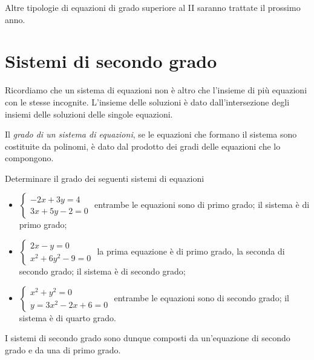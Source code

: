 
Altre tipologie di equazioni di grado superiore al II saranno trattate il 
prossimo anno.

\section{Sistemi di secondo grado}
\label{sec:eq2gr_sistemi}

Ricordiamo che un sistema di equazioni non è altro che l'insieme di più 
equazioni con le stesse incognite. L'insieme delle soluzioni è dato 
dall'intersezione degli insiemi delle soluzioni delle singole equazioni.

\begin{definizione}
Il \emph{grado di un sistema di equazioni}, se le equazioni che formano il 
sistema sono costituite da polinomi, è dato dal prodotto dei gradi delle 
equazioni che lo compongono.
\end{definizione}

\begin{exrig}
\begin{esempio}
Determinare il grado dei seguenti sistemi di equazioni

\begin{itemize}
\item $\left\{\begin{array}{l}-2x+3y=4 \\3x+5y-2=0\end{array}\right.$ entrambe 
le equazioni sono di primo grado; il sistema è di primo grado;
\item $\left\{\begin{array}{l}2x-y=0 \\x^2+6y^2-9=0\end{array}\right.$ la prima 
equazione è di primo grado, la seconda di secondo grado; il sistema è di secondo 
grado;
\item $\left\{\begin{array}{l}x^2+y^2=0 \\y=3x^2-2x+6=0\end{array}\right.$ 
entrambe le equazioni sono di secondo grado; il sistema è di quarto grado.
\end{itemize}
\end{esempio}
\end{exrig}
I sistemi di secondo grado sono dunque composti da un'equazione di secondo grado 
e da una di primo grado.

